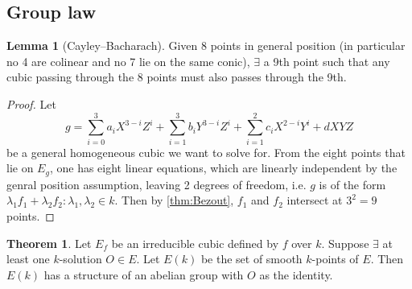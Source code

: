 \documentclass{article}
\theoremstyle{definition}
\newtheorem{thm}[defn]{Theorem}
\newtheorem{lemma}[defn]{Lemma}
\begin{document}
\subsection{Group law}
\begin{lemma}[Cayley--Bacharach]
Given 8 points in general position (in particular no 4 are colinear and no 7 lie on the same conic), $\exists$ a 9th point such that any cubic passing through the 8 points must also passes through the 9th.
\end{lemma}

\begin{minipage}{0.4\textwidth}
\begin{center}
\end{center}
\end{minipage}
\begin{minipage}{0.6\textwidth}
\begin{proof}
Let
\[
g=\sum_{i=0}^{3}a_i X^{3-i}Z^i + \sum_{i=1}^{3}b_i Y^{3-i}Z^i + \sum_{i=1}^2 c_i X^{2-i}Y^i + dXYZ
\]
be a general homogeneous cubic we want to solve for. From the eight points that lie on $E_g$, one has eight linear equations, which are linearly independent by the genral position assumption, leaving 2 degrees of freedom, i.e. $g$ is of the form $\lambda_1f_1+\lambda_2f_2:\lambda_1,\lambda_2\in k$. Then by \ref{thm:Bezout}, $f_1$ and $f_2$ intersect at $3^2=9$ points.
\end{proof}
\end{minipage}

\begin{thm}
Let $E_f$ be an irreducible cubic defined by $f$ over $k$. Suppose $\exists$ at least one $k$-solution $O\in E$. Let $E(k)$ be the set of smooth $k$-points of $E$. Then $E(k)$ has a structure of an abelian group with $O$ as the identity.
\end{thm}
\end{document}
